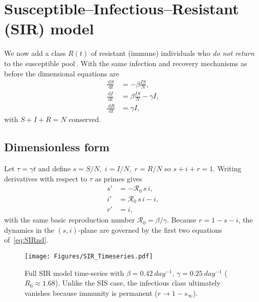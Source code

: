 \documentclass[11pt]{article}
\newcommand{\dd}{\,\mathrm{d}}
\newcommand{\RR}{\mathcal{R}_0}
\begin{document}
\section{Susceptible–Infectious–Resistant (SIR) model}
\label{sec:SIR}

We now add a class $R(t)$ of resistant (immune) individuals who
\emph{do not return} to the susceptible pool\,\citep{Kermack1927}.  
With the same infection and recovery mechanisms as before
the dimensional equations are
\begin{align*}
\frac{\dd S}{\dd t} &= -\beta \frac{I S}{N} ,          \\
\frac{\dd I}{\dd t} &=  \beta \frac{I S}{N}-\gamma I, \\
\frac{\dd R}{\dd t} &= \gamma I,
\end{align*}
with $S+I+R=N$ conserved.

\subsection*{Dimensionless form}
Let $\tau=\gamma t$ and define
\(s=S/N,\; i=I/N,\; r=R/N\) so $s+i+r=1$.
Writing derivatives with respect to $\tau$ as primes gives
\begin{subequations}\label{eq:SIRnd}
\begin{align}
s' &= -\RR\,s\,i,          \\
i' &=  \RR\,s\,i-i,        \\
r' &= i,
\end{align}
\end{subequations}
with the same basic reproduction number
\(\RR=\beta/\gamma\).
Because $r=1-s-i$, the dynamics in the
\((s,i)\)-plane are governed by the first two equations of~\cref{eq:SIRnd}.

\begin{figure}[H]
  \centering
  \texttt{[image: Figures/SIR\_Timeseries.pdf]}
  \caption{Full SIR model time-series with
           $\beta=\SI{0.42}{day^{-1}}$, $\gamma=\SI{0.25}{day^{-1}}$
           ($R_0\approx1.68$).  Unlike the SIS case, the infectious class
           ultimately vanishes because immunity is permanent ($r\to1-s_\infty$).}
  \label{fig:sir_timeseries}
\end{figure}
\end{document}
